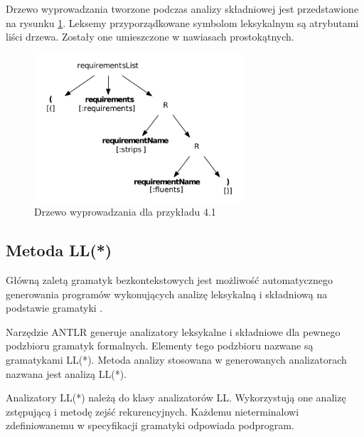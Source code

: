 Drzewo wyprowadzania tworzone podczas analizy składniowej jest przedstawione 
na rysunku \ref{antlr_example}. Leksemy przyporządkowane symbolom leksykalnym
są atrybutami liści drzewa. Zostały one umieszczone w nawiasach prostokątnych.

\begin{figure}[h!]
  \centering
    \includegraphics[width=0.7\textwidth]{img/antlr_example.pdf}
    \caption{Drzewo wyprowadzania dla przykładu 4.1} %
    \label{antlr_example}
\end{figure}

\subsection{Metoda LL(*)}
Główną zaletą gramatyk bezkontekstowych jest możliwość automatycznego generowania programów
wykonujących analizę leksykalną i składniową na podstawie gramatyki \cite{compilers}. 

Narzędzie ANTLR generuje analizatory leksykalne i składniowe dla pewnego podzbioru
gramatyk formalnych. Elementy tego podzbioru nazwane są gramatykami LL(*). Metoda 
analizy stosowana w generowanych analizatorach nazwana jest analizą LL(*). 

Analizatory LL(*) należą do klasy analizatorów LL. Wykorzystują one
analizę zstępującą i metodę zejść 
rekurencyjnych. Każdemu nieterminalowi zdefiniowanemu w specyfikacji gramatyki
odpowiada podprogram.

